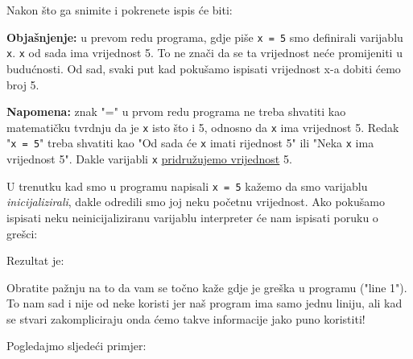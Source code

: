 	Nakon \v{s}to ga snimite i pokrenete ispis \'{c}e biti:


	\textbf{Obja\v{s}njenje:} u prevom redu programa, gdje pi\v{s}e \verb|x = 5| smo
	definirali varijablu \verb|x|. \verb|x| od sada ima vrijednost 5. To ne zna\v{c}i
	da se ta vrijednost ne\'{c}e promijeniti u budućnosti. 
	Od sad, svaki put kad poku\v samo ispisati vrijednost x-a dobiti \' cemo broj 5.

	\textbf{Napomena:} znak "=" u prvom redu programa ne treba shvatiti kao
	matemati\v{c}ku tvrdnju da je \verb+x+ isto \v{s}to i 5, odnosno da \verb+x+ ima
	vrijednost 5. Redak "\verb+x = 5+" treba shvatiti kao "Od sada \'{c}e \verb+x+
	imati rijednost 5" ili "Neka \verb+x+ ima vrijednost 5". Dakle varijabli
	\verb+x+ \underline{pridru\v{z}ujemo vrijednost} 5.

	U trenutku kad smo u programu napisali \verb|x = 5| ka\v{z}emo da smo varijablu
	\emph{inicijalizirali}, dakle odredili smo joj neku po\v cetnu vrijednost. Ako
	poku\v samo ispisati neku neinicijaliziranu varijablu interpreter \' ce nam ispisati
	poruku o gre\v sci:


	Rezultat je:


	Obratite pa\v znju na to da vam se to\v cno ka\v ze gdje je gre\v ska u programu
	("line 1"). To nam sad i nije od neke koristi jer na\v s program ima samo jednu
	liniju, ali kad se stvari zakompliciraju onda \' cemo takve informacije jako puno
	koristiti!
	
	Pogledajmo sljede\'{c}i primjer:


